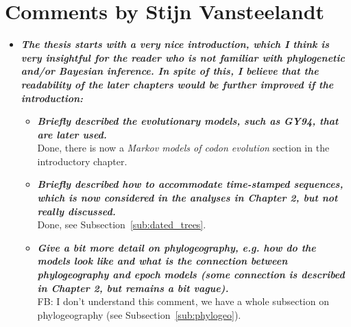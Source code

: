 \documentclass[english]{article}
\begin{document}

\section*{Comments by Stijn Vansteelandt}

\begin{itemize}

\item {
{\it
\textbf{
The thesis starts with a very nice introduction, which I think is very insightful for the reader who is not familiar with phylogenetic and/or Bayesian inference. 
In spite of this, I believe that the readability of the later chapters would be further improved if the introduction:
}%
}%
}%

\begin{itemize}

\item {
{\it
\textbf{
Briefly described the evolutionary models, such as GY94, that are later used.
}%
}%
}%
\\
Done, there is now a \emph{Markov models of codon evolution} section in the introductory chapter.


\item {
{\it
\textbf{
Briefly described how to accommodate time-stamped sequences, which is now considered in the analyses in Chapter 2, but not really discussed.
}%
}%
}%
\\
Done, see Subsection~\ref{sub:dated_trees}.




\item {
{\it
\textbf{
Give a bit more detail on phylogeography, e.g. how do the models look like and what is the connection between phylogeography and epoch models (some connection is described in Chapter 2, but remains a bit vague).
}%
}%
}%
\\
FB: I don't understand this comment, we have a whole subsection on phylogeography (see Subsection~\ref{sub:phylogeo}).




\end{itemize}


\end{itemize}
\end{document}
